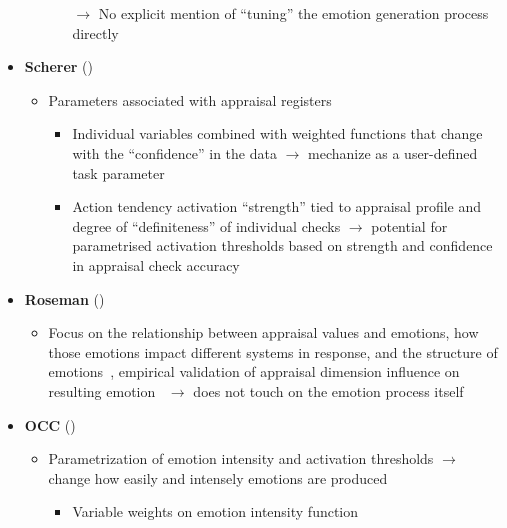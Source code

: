 \begin{itemize}
\begin{itemize}
\begin{itemize}
            \item [$\rightarrow$] No explicit mention of ``tuning'' the emotion
            generation process directly
        \end{itemize}
    \end{itemize}

    \item \textbf{Scherer} (\good)
    \begin{itemize}
        \item Parameters associated with appraisal
        registers~\citep[p.~105--106]{scherer2001appraisalB}
        \begin{itemize}
            \item Individual variables combined with weighted functions that
            change with the ``confidence'' in the data $\rightarrow$ mechanize
            as a user-defined task parameter

            \item Action tendency activation ``strength'' tied to appraisal
            profile and degree of ``definiteness'' of individual checks
            $\rightarrow$ potential for parametrised activation thresholds
            based on strength and confidence in appraisal check accuracy
        \end{itemize}
    \end{itemize}

    \item \textbf{Roseman} (\disqualified)
    \begin{itemize}
        \item Focus on the relationship between appraisal values and emotions,
        how those emotions impact different systems in response, and the
        structure of emotions~\citep[p.~68, 81]{roseman2001model}, empirical
        validation of appraisal dimension influence on resulting
        emotion~\citep[p.~242, 244]{roseman1996appraisal} $\rightarrow$ does
        not touch on the emotion process itself
    \end{itemize}

    \item \textbf{OCC} (\good)
    \begin{itemize}
        \item Parametrization of emotion intensity and activation thresholds
        $\rightarrow$ change how easily and intensely emotions are
        produced~\citep[p.~81--83, 184, 189]{occ}
        \begin{itemize}
            \item Variable weights on emotion intensity function


\end{itemize}
\end{itemize}
\end{itemize}
